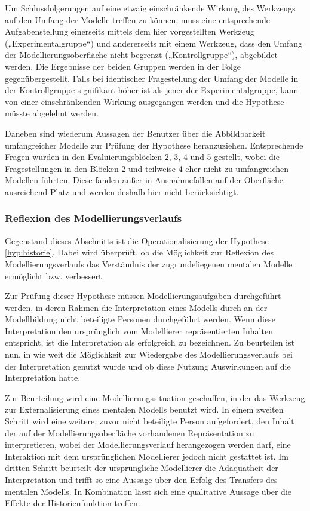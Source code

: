 Um Schlussfolgerungen auf eine etwaig einschränkende Wirkung des Werkzeugs auf den Umfang der Modelle treffen zu können, muss eine entsprechende Aufgabenstellung einerseits mittels dem hier vorgestellten Werkzeug („Experimentalgruppe“) und andererseits mit einem Werkzeug, dass den Umfang der Modellierungsoberfläche nicht begrenzt („Kontrollgruppe“), abgebildet werden. Die Ergebnisse der beiden Gruppen werden in der Folge gegenübergestellt. Falls bei identischer Fragestellung der Umfang der Modelle in der Kontrollgruppe signifikant höher ist als jener der Experimentalgruppe, kann von einer einschränkenden Wirkung ausgegangen werden und die Hypothese müsste abgelehnt werden.

Daneben sind wiederum Aussagen der Benutzer über die Abbildbarkeit umfangreicher Modelle zur Prüfung der Hypothese heranzuziehen. Entsprechende Fragen wurden in den Evaluierungsblöcken 2, 3, 4 und 5 gestellt, wobei die Fragestellungen in den Blöcken 2 und teilweise 4 eher nicht zu umfangreichen Modellen führten. Diese fanden außer in Ausnahmefällen auf der Oberfläche ausreichend Platz und werden deshalb hier nicht berücksichtigt.


\subsubsection{Reflexion des Modellierungsverlaufs} %
\label{ssub:reflexion_des_modellierungsverlaufs}

Gegenstand dieses Abschnitts ist die Operationalisierung der Hypothese \ref{hyp:historie}. Dabei wird überprüft, ob die Möglichkeit zur Reflexion des Modellierungsverlaufs das Verständnis der zugrundeliegenen mentalen Modelle ermöglicht bzw. verbessert.

Zur Prüfung dieser Hypothese müssen Modellierungsaufgaben durchgeführt werden, in deren Rahmen die Interpretation eines Modells durch an der Modellbildung nicht beteiligte Personen durchgeführt werden. Wenn diese Interpretation den ursprünglich vom Modellierer repräsentierten Inhalten entspricht, ist die Interpretation als erfolgreich zu bezeichnen. Zu beurteilen ist nun, in wie weit die Möglichkeit zur Wiedergabe des Modellierungsverlaufs bei der Interpretation genutzt wurde und ob diese Nutzung Auswirkungen auf die Interpretation hatte.

Zur Beurteilung wird eine Modellierungssituation geschaffen, in der das Werkzeug zur Externalisierung eines mentalen Modells benutzt wird. In einem zweiten Schritt wird eine weitere, zuvor nicht beteiligte Person aufgefordert, den Inhalt der auf der Modellierungsoberfläche vorhandenen Repräsentation zu interpretieren, wobei der Modellierungsverlauf herangezogen werden darf, eine Interaktion mit dem ursprünglichen Modellierer jedoch nicht gestattet ist. Im dritten Schritt beurteilt der ursprüngliche Modellierer die Adäquatheit der Interpretation und trifft so eine Aussage über den Erfolg des Transfers des mentalen Modells. In Kombination lässt sich eine qualitative Aussage über die Effekte der Historienfunktion treffen.    


